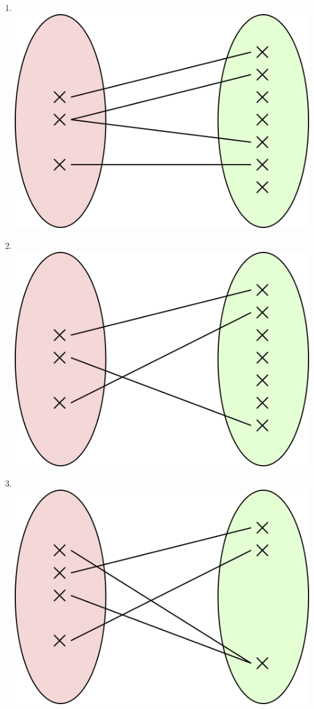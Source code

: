 \begin{exercice}[]
\begin{multicols}{2}
\begin{enumerate}
            \item 	\ \\\includegraphics[width=\myw]{ensembles/img/3.png}
            \item 	\ \\\includegraphics[width=\myw]{ensembles/img/4.png}
            \item 	\ \\\includegraphics[width=\myw]{ensembles/img/5.png}

\end{enumerate}
\end{multicols}
\end{exercice}
